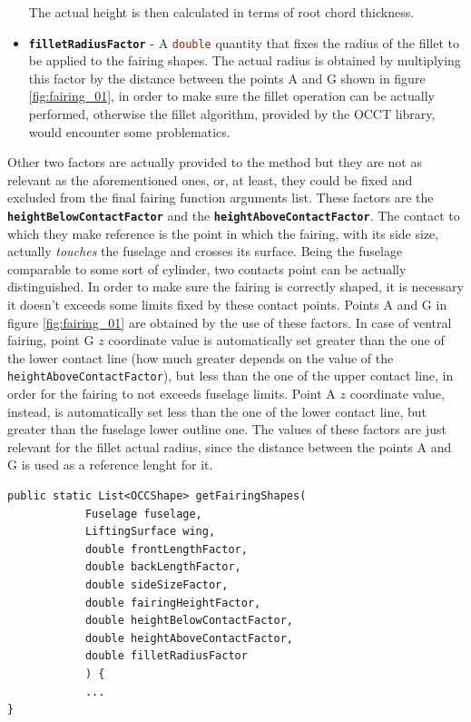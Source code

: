 \begin{itemize}
\begin{itemize}
\end{itemize}
%
The actual height is then calculated in terms of root chord thickness.
\item \textbf{\lstinline[language=Java]!filletRadiusFactor!} - A \lstinline[language=Java]!double! quantity that fixes the radius of the fillet to be applied to the fairing shapes. The actual radius is obtained by multiplying this factor by the distance between the points A and G shown in figure \ref{fig:fairing_01}, in order to make sure the fillet operation can be actually performed, otherwise the fillet algorithm, provided by the \gls{OCCT} library, would encounter some problematics.
\end{itemize}
%
Other two factors are actually provided to the method but they are not as relevant as the aforementioned ones, or, at least, they could be fixed and excluded from the final fairing function arguments list. These factors are the \textbf{\lstinline[language=Java]!heightBelowContactFactor!} and the \textbf{\lstinline[language=Java]!heightAboveContactFactor!}. The contact to which they make reference is the point in which the fairing, with its side size, actually \emph{touches} the fuselage and crosses its surface. Being the fuselage comparable to some sort of cylinder, two contacts point can be actually distinguished. In order to make sure the fairing is correctly shaped, it is necessary it doesn't exceeds some limits fixed by these contact points. Points A and G in figure \ref{fig:fairing_01} are obtained by the use of these factors. In case of ventral fairing, point G $z$ coordinate value is automatically set greater than the one of the lower contact line (how much greater depends on the value of the \lstinline[language=Java]!heightAboveContactFactor!), but less than the one of the upper contact line, in order for the fairing to not exceeds fuselage limits. Point A $z$ coordinate value, instead, is automatically set less than the one of the lower contact line, but greater than the fuselage lower outline one. The values of these factors are just relevant for the fillet actual radius, since the distance between the points A and G is used as a reference lenght for it.
%
\bigskip
\begin{lstlisting}[caption={Fairing CAD method}, captionpos=b, tabsize=2, label={lst:FairingCADMethod}]
public static List<OCCShape> getFairingShapes(
			Fuselage fuselage, 
			LiftingSurface wing,
			double frontLengthFactor,
			double backLengthFactor,
			double sideSizeFactor,
			double fairingHeightFactor,
			double heightBelowContactFactor,
			double heightAboveContactFactor,
			double filletRadiusFactor
			) {
			...
}
\end{lstlisting}
